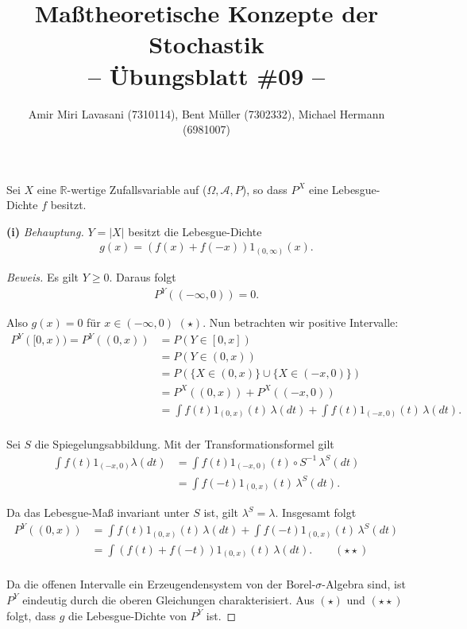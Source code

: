 \documentclass[10pt]{article}
\newcommand{\R}{\mathbb{R}}
\newcommand{\A}{\mathcal{A}}
\newcommand{\beh}{\textit{Behauptung. }}
\newenvironment{Aufgabe}[2][Aufgabe]{\begin{trivlist}
\item[\hskip \labelsep {\bfseries #1}\hskip \labelsep {\bfseries #2.}]}{\end{trivlist}}
\begin{document}
 
\title{ \textbf{Maßtheoretische Konzepte der Stochastik \\ -- Übungsblatt \#09 --} }

\author{Amir Miri Lavasani (7310114), Bent Müller (7302332),
        Michael Hermann (6981007)}
\maketitle

\begin{Aufgabe}{1} %
	Sei $X$ eine $\R$-wertige Zufallsvariable auf ($\Omega, \A, P$), so dass $P^X$ eine Lebesgue-Dichte $f$ besitzt. 
\end{Aufgabe}

\textbf{(i)}
\beh $Y = |X|$ besitzt die Lebesgue-Dichte 
	\begin{align*}
		g(x) = (f(x) + f(-x))1_{(0,\infty)}(x).
	\end{align*}

\begin{proof}[Beweis]
	 Es gilt $Y \geq 0$. Daraus folgt
	 \begin{align*}
		 P^{Y}((-\infty, 0)) = 0.
	 \end{align*}

	 Also $g(x) = 0$ für $x\in (-\infty,0)$ $(\star)$. Nun betrachten wir positive Intervalle:
	 \begin{align*}
		 P^{Y}([0,x)) = P^{Y}((0,x)) &= P(Y \in [0,x])  \\ 
		 			  &= P(Y \in (0,x))  \\ 
					  &= P(\{ X\in (0,x) \} \cup \{ X\in (-x,0) \}) \\
					  &= P^X((0,x)) + P^X((-x,0))				\\
					  &= \int f(t)1_{(0,x)}(t) \,\lambda(dt) + \int f(t)1_{(-x,0)}(t) \,\lambda(dt). \\ 
	 \end{align*}

	 Sei $S$ die Spiegelungsabbildung. Mit der Transformationsformel gilt
	 \begin{align*}
		\int f(t)1_{(-x,0)} \lambda(dt) &= \int f(t)1_{(-x,0)}(t) \circ S^{-1} \,\lambda^{S}(dt)   \\
										&= \int f(-t)1_{(0,x)}(t) \,\lambda^{S}(dt).
	 \end{align*}

	 Da das Lebesgue-Maß invariant unter $S$ ist, gilt $\lambda^S = \lambda$. Insgesamt folgt
	 \begin{align*}
		P^{Y}((0,x)) &= \int f(t)1_{(0,x)}(t) \,\lambda(dt) + \int f(-t)1_{(0,x)}(t) \,\lambda^{S}(dt) 	\\
					 &= \int (f(t) + f(-t)) 1_{(0,x)}(t) \,\lambda(dt).		\qquad (\star\star) \\
	 \end{align*}

	  Da die offenen Intervalle ein Erzeugendensystem von der Borel-$\sigma$-Algebra sind, ist $P^{Y}$ eindeutig durch die 
	  oberen Gleichungen charakterisiert.
	  Aus $(\star)$ und $(\star\star)$ folgt, dass $g$ die Lebesgue-Dichte von $P^{Y}$ ist.
\end{proof}
 
\end{document}

